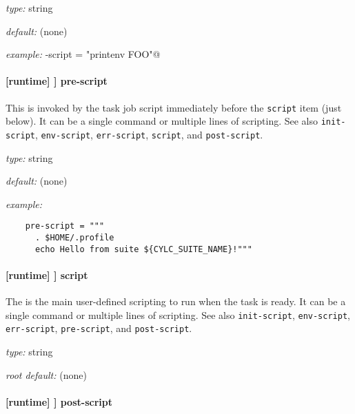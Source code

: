 \begin{myitemize}
\item {\em type:} string
\item {\em default:} (none)
\item {\em example:} \lstinline@err-script = "printenv FOO"@
\end{myitemize}

\paragraph[pre-script]{ [runtime] \textrightarrow [[\_\_NAME\_\_]] \textrightarrow pre-script}

This is invoked by the task job script immediately before the \lstinline=script=
item (just below). It can be a single command or multiple lines of scripting.
See also \lstinline=init-script=, \lstinline=env-script=, \lstinline=err-script=,
\lstinline=script=, and \lstinline=post-script=.

\begin{myitemize}
\item {\em type:} string
\item {\em default:} (none)
\item {\em example:}
 \begin{lstlisting}
    pre-script = """
      . $HOME/.profile
      echo Hello from suite ${CYLC_SUITE_NAME}!"""
 \end{lstlisting}
\end{myitemize}

\paragraph[script]{[runtime] \textrightarrow [[\_\_NAME\_\_]] \textrightarrow script}
\label{ScriptItem}

The is the main user-defined scripting to run when the task is ready. It can be a
single command or multiple lines of scripting. See also \lstinline=init-script=,
\lstinline=env-script=, \lstinline=err-script=, \lstinline=pre-script=, and
\lstinline=post-script=.

\begin{myitemize}
\item {\em type:} string
\item {\em root default:} (none)
\end{myitemize}

\paragraph[post-script]{ [runtime] \textrightarrow [[\_\_NAME\_\_]] \textrightarrow post-script}

